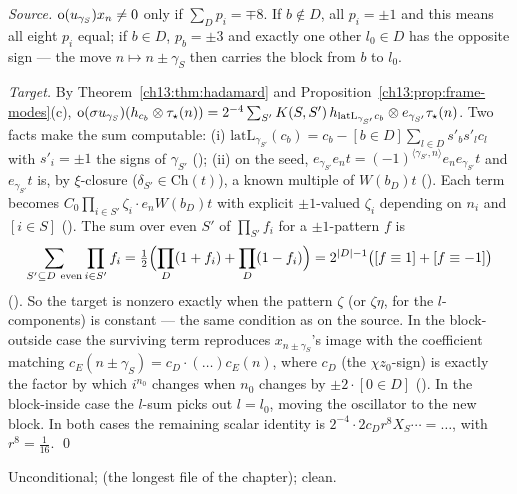 \emph{Source.} $\operatorname{o}(u_{\gamma_S})x_n\ne0$ only if $\sum_Dp_i=\mp8$. If $b\notin D$, all $p_i=\pm1$ and this means
all eight $p_i$ equal; if $b\in D$, $p_b=\pm3$ and exactly one other $l_0\in D$ has the opposite sign --- the
move $n\mapsto n\pm\gamma_S$ then carries the block from $b$ to $l_0$.

\emph{Target.} By Theorem~\ref{ch13:thm:hadamard} and Proposition~\ref{ch13:prop:frame-modes}(c),
$\operatorname{o}(\sigma u_{\gamma_S})(h_{c_b}\otimes\tau_\star(n))=2^{-4}\sum_{S'}K(S,S')\,h_{\mathrm{latL}_{\gamma_{S'}}c_b}\otimes
e_{\gamma_{S'}}\tau_\star(n)$. Two facts make the sum computable:
(i) $\mathrm{latL}_{\gamma_{S'}}(c_b)=c_b-[b\in D]\sum_{l\in D}s'_bs'_lc_l$ with $s'_i=\pm1$ the signs of $\gamma_{S'}$
(); (ii) on the seed, $e_{\gamma_{S'}}e_nt=(-1)^{\langle\gamma_{S'},n\rangle}e_ne_{\gamma_{S'}}t$ and $e_{\gamma_{S'}}t$ is, by
$\xi$-closure ($\delta_{S'}\in\mathrm{Ch}(t)$), a known multiple of $W(b_D)t$ (). Each term becomes
$C_0\prod_{i\in S'}\zeta_i\cdot e_nW(b_D)t$ with explicit $\pm1$-valued $\zeta_i$ depending on $n_i$ and $[i\in S]$
(). The sum over even $S'$ of $\prod_{S'}f_i$ for a $\pm1$-pattern $f$ is
\begin{equation*}
  \sum_{S'\subseteq D\ \mathrm{even}}\prod_{i\in S'}f_i=\tfrac12\Bigl(\prod_D(1+f_i)+\prod_D(1-f_i)\Bigr)=2^{|D|-1}\bigl([f\equiv1]+[f\equiv-1]\bigr)
\end{equation*}
(). So the target is nonzero exactly when the pattern $\zeta$ (or $\zeta\eta$, for the
$l$-components) is constant --- the same condition as on the source. In the block-outside case the
surviving term reproduces $x_{n\pm\gamma_S}$'s image with the coefficient matching
$c_E(n\pm\gamma_S)=c_D\cdot(\dots)c_E(n)$, where $c_D$ (the $\chi z_0$-sign) is exactly the factor by which
$i^{n_0}$ changes when $n_0$ changes by $\pm2\cdot[0\in D]$ (). In the block-inside case the
$l$-sum picks out $l=l_0$, moving the oscillator to the new block. In both cases the remaining scalar
identity is $2^{-4}\cdot2c_Dr^8X_S\cdots=\dots$, with $r^8=\tfrac1{16}$. \qed
\begin{status}Unconditional;  (the longest file of the chapter);
 clean.\end{status}

